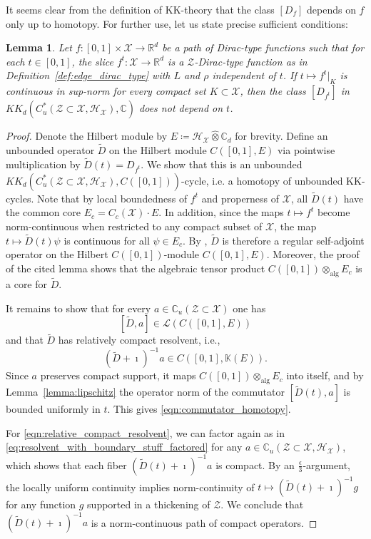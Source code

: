 \documentclass[12pt]{amsart}
\newtheorem{lemma}[theorem]{Lemma}
\newcommand{\CM}{{\mathbb C}}
\newcommand{\RM}{{\mathbb R}}
\newcommand{\KM}{{\mathbb K}}
\newcommand{\Hh}{{\mathcal H}}
\newcommand{\Xx}{{\mathcal X}}
\newcommand{\Zz}{{\mathcal Z}}
\begin{document}
It seems clear from the definition of KK-theory that the class $[D_f]$ depends on $f$ only up to homotopy. For further use, let us state precise sufficient conditions:

\begin{lemma}
\label{lemma:homotopy}
Let $f: [0,1] \times \Xx \to \RM^d$ be a path of Dirac-type functions such that for each $t\in [0,1]$, the slice $f^{t}: \Xx \to \RM^d$ is a $\Zz$-Dirac-type function as in Definition~\ref{def:edge_dirac_type} with $L$ and $\rho$ independent of $t$. If $t\mapsto f^t\rvert_{K}$ is continuous in sup-norm for every compact set $K\subset \Xx$, then the class $[D_{f^{t}}]$ in $KK_{d}(C^*_u(\Zz\subset \Xx, \Hh_\Xx), \CM)$ does not depend on $t$.
\end{lemma}
\begin{proof}
Denote the Hilbert module by $E\coloneqq \Hh_\Xx\hat{\otimes} \CM_d$ for brevity. Define an unbounded operator $\tilde{D}$ on the Hilbert module $C([0,1], E)$ via pointwise multiplication by $\tilde{D}(t)=D_{f^{t}}$. We show that this is an unbounded $KK_{d}(C^*_{u}(\Zz\subset \Xx, \Hh_\Xx),C([0,1]))$-cycle, i.e. a homotopy of unbounded KK-cycles. Note that by local boundedness of $f^t$ and properness of $\Xx$, all $\tilde{D}(t)$ have the common core $E_c=C_c(\Xx)\cdot E$. In addition, since the maps $t\mapsto f^{t}$ become norm-continuous when restricted to any compact subset of $\Xx$, the map $t \mapsto \tilde{D}(t)\psi$ is continuous for all $\psi \in E_c$. By \cite[Lemma~1.15]{vanDenDungenMesland2020}, $\tilde{D}$ is therefore a regular self-adjoint operator on the Hilbert $C([0,1])$-module $C([0,1], E)$. Moreover, the proof of the cited lemma shows that the algebraic tensor product $C([0,1])\otimes_{\mathrm{alg}}E_c$ is a core for $\tilde{D}$.

It remains to show that for every $a \in \CM_u(\Zz\subset \Xx)$ one has
\begin{equation}\label{eqn:commutator_homotopy}
[\tilde{D}, a]\in \mathcal{L}(C([0,1], E))
\end{equation}
and that $\tilde{D}$ has relatively compact resolvent, i.e.,
\begin{equation}\label{eqn:relative_compact_resolvent}
(\tilde{D}+\imath)^{-1} a \in C([0,1], \KM(E)).
\end{equation}
Since $a$ preserves compact support, it maps $C([0,1])\otimes_{\mathrm{alg}}E_c$ into itself, and by Lemma~\ref{lemma:lipschitz} the operator norm of the commutator $[\tilde{D}(t),a]$ is bounded uniformly in $t$. This gives \eqref{eqn:commutator_homotopy}.

For \eqref{eqn:relative_compact_resolvent}, we can factor again as in \eqref{eq:resolvent_with_boundary_stuff_factored} for any $a\in \CM_u(\Zz\subset\Xx,\Hh_\Xx)$, which shows that each fiber $(\tilde{D}(t)+\imath)^{-1} a$ is compact. By an $\frac{\epsilon}{3}$-argument, the locally uniform continuity implies norm-continuity of $t\mapsto (\tilde{D}(t)+\imath)^{-1}g$ for any function $g$ supported in a thickening of $\Zz$. We conclude that $(\tilde{D}(t)+\imath)^{-1} a$ is a norm-continuous path of compact operators.
\end{proof}
\end{document}
